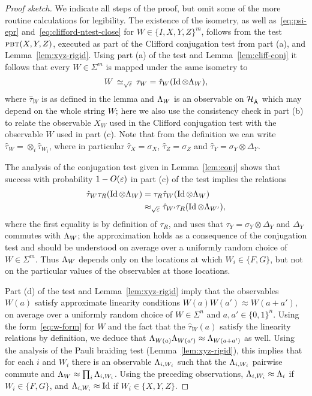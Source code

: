 \begin{proof}[Proof sketch]
We indicate all steps of the proof, but omit some of the more routine calculations for legibility. 
The existence of the isometry, as well as~\eqref{eq:psi-epr} and~\eqref{eq:clifford-ntest-close} for $W \in \{I,X,Y,Z\}^{m}$, follows from the test $\textsc{pbt}(X,Y,Z)$, executed as part of the Clifford conjugation test from part (a), and Lemma~\ref{lem:xyz-rigid}. 
Using part (a) of the test and Lemma~\ref{lem:cliff-conj} it follows that every $W \in \Sigma^m$ is mapped under the same isometry to 
\begin{equation}\label{eq:w-form}
W \,\simeq_{\sqrt{\varepsilon}}\, \tau_W = \hat{\tau}_W(\mathop{\rm Id}\nolimits \otimes \Lambda_W),
\end{equation}
 where $\hat{\tau}_W$ is as defined in the lemma  and  $\Lambda_W$ is an observable on $\mathcal{H}_{\hat{{\textsf{A}}}}$ which may depend on the whole string $W$;  here we also use the consistency check in part (b) to relate  the observable $X_W$ used in the Clifford conjugation test with the observable $W$ used in part (c). Note that from the definition we can write $\hat{\tau}_W = \otimes_i \hat{\tau}_{W_i}$, where in particular $\hat{\tau}_X = \sigma_X$, $\hat{\tau}_Z = \sigma_Z$ and $\hat{\tau}_Y = \sigma_Y \otimes \Delta_Y$.

The analysis of the conjugation test given in Lemma~\ref{lem:conj} shows that success with probability $1-O(\varepsilon)$ in part (c) of the test implies the relations 
\begin{align*}
 \hat{\tau}_W \tau_R(\mathop{\rm Id}\nolimits \otimes \Lambda_W)  &= \tau_R \hat{\tau}_W  (\mathop{\rm Id}\nolimits\otimes\Lambda_W) \\
&  \approx_{\sqrt{\varepsilon}} \hat{\tau}_{W'}  \tau_R (\mathop{\rm Id}\nolimits\otimes \Lambda_{W'}),
\end{align*}
where the first equality is by definition of $\tau_R$, and uses that $\tau_Y = \sigma_Y \otimes \Delta_Y$ and $\Delta_Y$ commutes with $\Lambda_W$; the approximation holds as a consequence of the conjugation test and should be understood on average over a uniformly random choice of $W\in \Sigma^m$. Thus $\Lambda_W$ depends only on the locations at which $W_i \in \{F,G\}$, but not on the particular values of the observables at those locations.  

Part (d) of the test and Lemma~\ref{lem:xyz-rigid} imply that the observables $W(a)$ satisfy approximate linearity conditions $W(a)W(a')\approx W(a+a')$, on average over a uniformly random choice of $W\in\Sigma^n$ and $a,a'\in\{0,1\}^n$. Using the form~\eqref{eq:w-form} for $W$ and the fact that the $\hat{\tau}_W(a)$ satisfy the linearity relations by definition, we deduce that $\Lambda_{W(a)}\Lambda_{{W(a')}} \approx \Lambda_{W(a+a')}$ as well. Using the analysis of the Pauli braiding test (Lemma~\ref{lem:xyz-rigid}), this implies that for each $i$ and $W_i$ there is an observable $\Lambda_{i,W_i}$ such that the $\Lambda_{i,W_i}$ pairwise commute and $\Lambda_W \approx \prod_i \Lambda_{i,W_i}$. Using the preceding observations, $\Lambda_{i,W_i} \approx \Lambda_i$ if $W_i \in\{F,G\}$, and $\Lambda_{i,W_i} \approx \mathop{\rm Id}\nolimits$ if $W_i \in \{X,Y,Z\}$. 


\end{proof}
